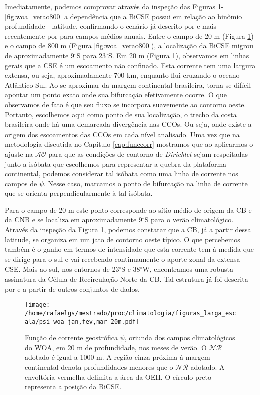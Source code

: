 Imediatamente, podemos comprovar através da inspeção das Figuras \ref{fig:woa_verao20}-\ref{fig:woa_verao800}
a dependência que a BiCSE possui em relação ao binômio profundidade - latitude, confirmando 
o cenário já descrito por \cite{stramma_england1999} e mais recentemente por \cite{rodrigues_etal2006} para campos médios anuais.
Entre o campo de 20 m (Figura \ref{fig:woa_verao20}) e o campo de 800 m (Figura \ref{fig:woa_verao800}), 
a localização da BiCSE migrou de aproximadamente 9$^\circ$S para 23$^\circ$S. 
Em 20 m (Figura \ref{fig:woa_verao20}), observamos em linhas gerais que a CSE é um escoamento não confinado. 
Esta corrente tem uma largura extensa, ou seja,  aproximadamente 700 km, enquanto flui
cruzando o oceano Atlântico Sul. Ao se aproximar da margem continental brasileira,
torna-se difícil apontar um ponto exato onde sua bifurcação efetivamente ocorre. O que observamos de fato é que 
seu fluxo se incorpora suavemente ao contorno oeste. Portanto, escolhemos aqui como ponto de sua localização,
 o trecho da costa brasileira onde há uma demarcada divergência nas CCOs. Ou seja, onde 
existe a origem dos escoamentos das CCOs em cada nível analisado. Uma vez que na metodologia discutida no 
Capítulo \ref{cap:funccorr} mostramos que ao aplicarmos o ajuste na $\mathcal{AO}$ para que as condições 
de contorno de \textit{Dirichlet} sejam respeitadas junto a isóbata que escolhemos para representar 
a quebra da plataforma continental, podemos considerar tal isóbata como uma linha de corrente
nos campos de $\psi$. Nesse caso, marcamos o ponto de bifurcação na linha de corrente que se orienta 
perpendicularmente à tal isóbata. 

Para o campo de 20 m este ponto
corresponde ao sítio médio de origem da CB e 
da CNB e se localiza em aproximadamente 9$^\circ$S para o verão climatológico. 
Através da inspeção da Figura \ref{fig:woa_verao20},
podemos constatar que a CB, já a partir dessa latitude, se organiza em um jato de contorno oeste típico. O que 
percebemos também é o ganho em termos de intensidade que esta corrente tem à medida que se dirige para o sul
e vai recebendo continuamente o aporte zonal da extensa CSE. Mais ao sul, nos entornos de 23$^\circ$S e
 38$^\circ$W, encontramos uma robusta assinatura da Célula de Recirculação
Norte da CB. Tal estrutura já foi descrita por \cite{tsuchiya1985} e \cite{mattos2006}
a partir de outros conjuntos de dados.

\begin{figure}%
 \begin{center}
  \texttt{[image: /home/rafaelgs/mestrado/proc/climatologia/figuras\_larga\_escala/psi\_woa\_jan,fev,mar\_20m.pdf]}
 \end{center}
 \vspace{-.25cm}
 \renewcommand{\baselinestretch}{1}
 \caption{\label{fig:woa_verao20} \small Função de corrente geostrófica $\psi$, oriunda dos campos 
  climatológicos do WOA, em 20 m de profundidade, nos meses de verão. O 
  $\mathcal{NR}$ adotado é igual a 1000 m. A região cinza próxima à margem continental denota 
  profundidades menores que o $\mathcal{NR}$ adotado. A envoltória vermelha delimita a área da 
 OEII. O círculo preto representa a posição da BiCSE.}
\end{figure}

